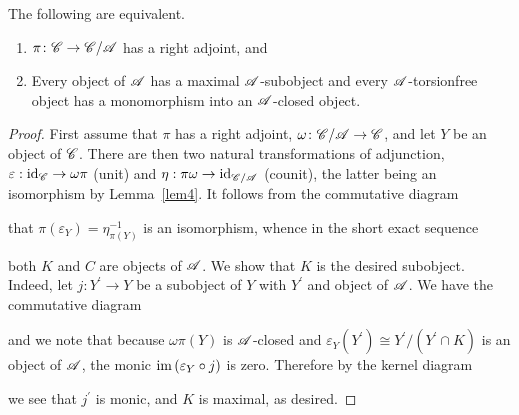 \documentclass[dissertation.tex]{subfiles}
\begin{document}
\begin{thm}\label{thm1}
  The following are equivalent.
  \begin{enumerate}
  \item
    $\pi \colon \mathscr{C} \rightarrow \mathscr{C}/\mathscr{A}$ has a right adjoint, and
  \item
    Every object of $\mathscr{A}$ has a maximal $\mathscr{A}$-subobject and every $\mathscr{A}$-torsionfree object has a monomorphism into an $\mathscr{A}$-closed object.
  \end{enumerate}

  \begin{proof}
    First assume that $\pi$ has a right adjoint, $\omega \colon \mathscr{C}/\mathscr{A} \rightarrow \mathscr{C}$, and let $Y$ be an object of $\mathscr{C}$.
    There are then two natural transformations of adjunction, $\varepsilon : \operatorname{id}_{\mathscr{C}} \rightarrow \omega\pi$ (unit) and $\eta : \pi\omega \rightarrow \operatorname{id}_{\mathscr{C}/\mathscr{A}}$ (counit), the latter being an isomorphism by Lemma~\ref{lem4}.
    It follows from the commutative diagram
    \begin{center}
    \end{center}
    that $\pi(\varepsilon_Y) = \eta_{\pi(Y)}^{-1}$ is an isomorphism, whence in the short exact sequence    
    \begin{center}
    \end{center}
    both $K$ and $C$ are objects of $\mathscr{A}$.
    We show that $K$ is the desired subobject.
    Indeed, let $j \colon Y^\prime \rightarrow Y$ be a subobject of $Y$ with $Y^\prime$ and object of $\mathscr{A}$.
    We have the commutative diagram
    \begin{center}
    \end{center}
    and we note that because $\omega\pi(Y)$ is $\mathscr{A}$-closed and $\varepsilon_Y(Y^\prime) \cong Y^\prime/\left(Y^\prime \cap K\right)$ is an object of $\mathscr{A}$, the monic $\operatorname{im}{(\varepsilon_Y \circ j)}$ is zero.
    Therefore by the kernel diagram
    \begin{center}
    \end{center}
    we see that $j^\prime$ is monic, and $K$ is maximal, as desired. 
    

\end{proof}
\end{thm}
\end{document}
